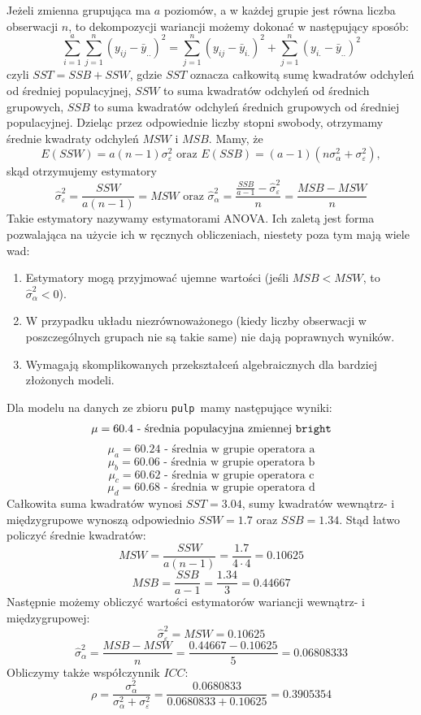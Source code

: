 \documentclass[12pt]{mwbk}
\theoremstyle{plain}
\theoremstyle{definition}
\theoremstyle{remark}
\begin{document}
Jeżeli zmienna grupująca ma $a$ poziomów, a w każdej grupie jest równa liczba obserwacji $n$, to dekompozycji wariancji możemy dokonać w następujący sposób:
$$
\sum_{i=1}^{a} \sum_{j=1}^{n}(y_{ij}-\bar{y}_{..})^2=\sum_{j=1}^{n}(y_{ij}-\bar{y}_{i.})^2+\sum_{j=1}^{n}(y_{i.}-\bar{y}_{..})^2
$$
czyli $SST=SSB+SSW$, gdzie $SST$ oznacza całkowitą sumę kwadratów odchyleń od średniej populacyjnej, $SSW$ to suma kwadratów odchyleń od średnich grupowych, $SSB$ to suma kwadratów odchyleń średnich grupowych od średniej populacyjnej. Dzieląc przez odpowiednie liczby stopni swobody, otrzymamy średnie kwadraty odchyleń $MSW$ i $MSB$. Mamy, że
$$E(SSW)=a(n-1)\sigma_{\varepsilon}^2 \text{ oraz } E(SSB)=(a-1)(n\sigma_{\alpha}^2+\sigma_{\varepsilon}^2),$$
skąd otrzymujemy estymatory
$$\hat{\sigma}_{\varepsilon}^2=\frac{SSW}{a(n-1)}=MSW \text{ oraz } \hat{\sigma}_{\alpha}^2=\frac{\frac{SSB}{a-1}-\hat{\sigma}_{\varepsilon}^2}{n}=\frac{MSB-MSW}{n}$$
Takie estymatory nazywamy estymatorami ANOVA. Ich zaletą jest forma pozwalająca na użycie ich w ręcznych obliczeniach, niestety poza tym mają wiele wad:
\begin{enumerate}
	\item Estymatory mogą przyjmować ujemne wartości (jeśli $MSB<MSW$, to $\hat{\sigma}_{\alpha}^2<0$).
	\item W przypadku układu niezrównoważonego (kiedy liczby obserwacji w poszczególnych grupach nie są takie same) nie dają poprawnych wyników.
	\item Wymagają skomplikowanych przekształceń algebraicznych dla bardziej złożonych modeli.
\end{enumerate}  

Dla modelu na danych ze zbioru \texttt{pulp} mamy następujące wyniki:
$$\mu= 60.4\text{ - średnia populacyjna zmiennej \texttt{bright}}$$
$$\mu_a=60.24 \text{ - średnia w grupie operatora a}$$
$$\mu_b=60.06 \text{ - średnia w grupie operatora b}$$
$$\mu_c=60.62 \text{ - średnia w grupie operatora c}$$
$$\mu_d=60.68 \text{ - średnia w grupie operatora d}$$
Całkowita suma kwadratów wynosi $SST=3.04$, sumy kwadratów wewnątrz- i międzygrupowe wynoszą odpowiednio $SSW=1.7$ oraz $SSB=1.34$. Stąd łatwo policzyć średnie kwadratów:
$$MSW=\frac{SSW}{a(n-1)}=\frac{1.7}{4\cdot 4}=0.10625$$
$$MSB=\frac{SSB}{a-1}=\frac{1.34}{3}=0.44667$$
Następnie możemy obliczyć wartości estymatorów wariancji wewnątrz- i międzygrupowej:
$$\hat{\sigma}_{\varepsilon}^2=MSW=0.10625$$
$$\hat{\sigma}_{\alpha}^2=\frac{MSB-MSW}{n}=\frac{0.44667-0.10625}{5}=0.06808333$$
Obliczymy także współczynnik $ICC$:
$$\rho = \frac{\sigma^2_{\alpha}}{\sigma_{\alpha}^2+\sigma_{\varepsilon}^2}=\frac{0.0680833}{0.0680833+0.10625}=0.3905354$$
\end{document}
